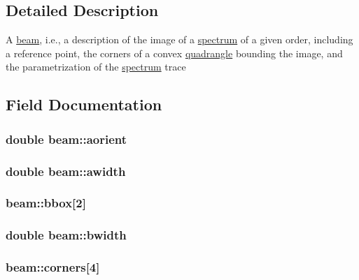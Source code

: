 \subsection{Detailed Description}
A \hyperlink{structbeam}{beam}, i.e., a description of the image of a \hyperlink{structspectrum}{spectrum} of a given order, including a reference point, the corners of a convex \hyperlink{structquadrangle}{quadrangle} bounding the image, and the parametrization of the \hyperlink{structspectrum}{spectrum} trace 

\subsection{Field Documentation}
\hypertarget{structbeam_a5cbf4e447f3c6272f31215965e4d574c}{
\subsubsection[{aorient}]{\setlength{\rightskip}{0pt plus 5cm}double {\bf beam::aorient}}}
\label{structbeam_a5cbf4e447f3c6272f31215965e4d574c}
\hypertarget{structbeam_a9a40c792769161a2526fb415c6dadad0}{
\subsubsection[{awidth}]{\setlength{\rightskip}{0pt plus 5cm}double {\bf beam::awidth}}}
\label{structbeam_a9a40c792769161a2526fb415c6dadad0}
\hypertarget{structbeam_aa703d04290c347c35197ff52993b98f3}{
\subsubsection[{bbox}]{ {\bf beam::bbox}\mbox{[}2\mbox{]}}}
\label{structbeam_aa703d04290c347c35197ff52993b98f3}
\hypertarget{structbeam_acc52e3393f91f5f11a65d1a6806b681f}{
\subsubsection[{bwidth}]{\setlength{\rightskip}{0pt plus 5cm}double {\bf beam::bwidth}}}
\label{structbeam_acc52e3393f91f5f11a65d1a6806b681f}
\hypertarget{structbeam_a785bab6bf808db6a8841654312d20899}{
\subsubsection[{corners}]{ {\bf beam::corners}\mbox{[}4\mbox{]}}}
